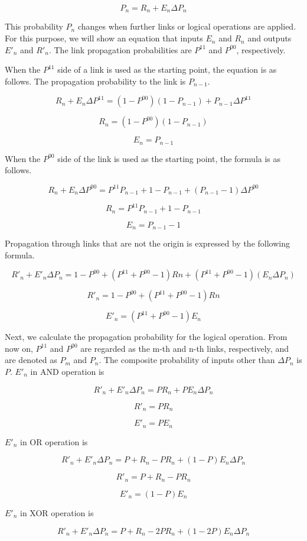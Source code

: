 \documentclass[12pt]{article}
\begin{document}
\[ P_n = R_n+ E_n\Delta P_n \]

This probability \(P_n\) changes when further links or logical
operations are applied. For this purpose, we will show an equation that
inputs \(E_n\) and \(R_n\) and outputs \(E'_n\) and \(R'_n\). The link
propagation probabilities are \(P^{11}\) and \(P^{00}\), respectively.

When the \(P^{11}\) side of a link is used as the starting point, the
equation is as follows. The propagation probability to the link is
\(P_{n-1}\).

\[ R_n+E_n\Delta P^{11}=(1-P^{00})(1-P_{n-1})+P_{n-1} \Delta P^{11}\]

\[ R_n = (1-P^{00})(1-P_{n-1})\]

\[ E_n=P_{n-1} \]

When the \(P^{00}\) side of the link is used as the starting point, the
formula is as follows.

\[ R_n+E_n\Delta P^{00}=P^{11}P_{n-1}+1-P_{n-1}+(P_{n-1}-1)\Delta P^{00}\]

\[ R_n = P^{11}P_{n-1}+1-P_{n-1}\]

\[ E_n=P_{n-1}-1\]

Propagation through links that are not the origin is expressed by the
following formula.

\[ R'_n+E'_n\Delta P_n=1-P^{00}+(P^{11}+P^{00}-1)Rn + (P^{11}+P^{00}-1)( E_n\Delta P_n)\]

\[ R'_n=1-P^{00}+(P^{11}+P^{00}-1)Rn \]

\[ E'_n= (P^{11}+P^{00}-1)E_n\]

Next, we calculate the propagation probability for the logical
operation. From now on, \(P^{11}\) and \(P^{00}\) are regarded as the
m-th and n-th links, respectively, and are denoted as \(P_{m}\) and
\(P_{n}\). The composite probability of inputs other than \(\Delta P_n\)
is \(P\). \(E'_n\) in AND operation is

\[ R'_n + E'_n\Delta P_n=PR_n+PE_n \Delta P_n\]

\[ R'_n = PR_n\]

\[ E'_n=PE_n\]

\(E'_n\) in OR operation is

\[ R'_n + E'_n\Delta P_n=P+R_n-PR_n+(1-P)E_n \Delta P_n\]

\[ R'_n = P+R_n-PR_n\]

\[ E'_n=(1-P)E_n\]

\(E'_n\) in XOR operation is

\[ R'_n + E'_n\Delta P_n=P + R_n-2PR_n+ (1-2P)E_n \Delta P_n \]
\end{document}
